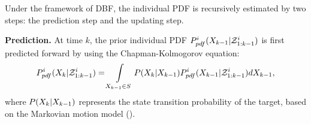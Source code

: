 	Under the framework of DBF, the individual PDF is recursively estimated by two steps: the prediction step and the updating step. 
	
	\textbf{Prediction.}
	At time $k$, the prior individual PDF $P^i_{pdf}(X_{k-1}|\mathcal{Z}^i_{1:k-1})$ is first predicted forward by using the Chapman-Kolmogorov equation:
	\small
	\begin{equation}\label{eqn:bayes_pred}
	P^i_{pdf}(X_k|\mathcal{Z}^i_{1:k-1})
	=\int\limits_{X_{k-1}\in S} P(X_k|X_{k-1})P^i_{pdf}(X_{k-1}|\mathcal{Z}^i_{1:k-1})dX_{k-1},
	\end{equation}\normalsize
	where $P(X_k|X_{k-1})$ represents the state transition probability of the target, based on the Markovian motion model (). %
	
